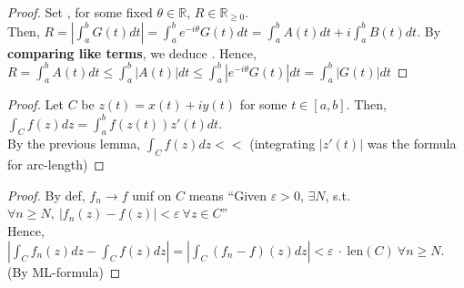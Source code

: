 \documentclass[12pt,a4paper]{article}
\begin{document}
\vspace{0.5em}

\begin{proof}
  Set , for some fixed $\theta \in \mathbb{R}$, $R \in \mathbb{R}_{\geq 0}$. \\

  \noindent Then, $R = |\int_a^b G(t) dt| = \int_a^b e^{-i\theta} G(t)dt = \int_a^b A(t) dt + i \int_a^b B(t) dt$. By \textbf{comparing like terms}, we deduce . Hence, $R = \int_a^b A(t) dt \leq \int_a^b |A(t)| dt \leq \int_a^b |e^{-i\theta} G(t)| dt = \int_a^b |G(t)| dt$
\end{proof}


\begin{proof}
  Let $C$ be $z(t) = x(t) + iy(t)$ for some $t \in [a, b]$. Then, $\int_C f(z) dz = \int_a^b f(z(t)) z'(t) dt$. \\ 
  
  \noindent By the previous lemma, $\int_C f(z) dz <<$  (integrating $|z'(t)|$ was the formula for arc-length)
\end{proof}



\begin{proof}
  By def, $f_n \to f$ unif on $C$ means ``Given $\varepsilon > 0$, $\exists N$, s.t. $\forall n \geq N,\ |f_n(z) - f(z)| < \varepsilon\ \forall z \in C$'' \\

  \noindent Hence, $|\int_C f_n(z) dz - \int_C f(z) dz| = |\int_C (f_n - f)(z) dz| < \varepsilon\ \cdot\ \text{len}(C)\ \forall n \geq N$. (By ML-formula)
\end{proof}
\end{document}
